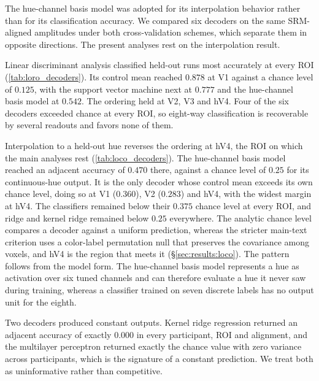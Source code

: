 The hue-channel basis model was adopted for its interpolation behavior rather than for its classification accuracy. We compared six decoders on the same SRM-aligned amplitudes under both cross-validation schemes, which separate them in opposite directions. The present analyses rest on the interpolation result.

Linear discriminant analysis classified held-out runs most accurately at every ROI (\cref{tab:loro_decoders}). Its control mean reached $0.878$ at V1 against a chance level of $0.125$, with the support vector machine next at $0.777$ and the hue-channel basis model at $0.542$. The ordering held at V2, V3 and hV4. Four of the six decoders exceeded chance at every ROI, so eight-way classification is recoverable by several readouts and favors none of them.

Interpolation to a held-out hue reverses the ordering at hV4, the ROI on which the main analyses rest (\cref{tab:loco_decoders}). The hue-channel basis model reached an adjacent accuracy of $0.470$ there, against a chance level of $0.25$ for its continuous-hue output. It is the only decoder whose control mean exceeds its own chance level, doing so at V1 ($0.360$), V2 ($0.283$) and hV4, with the widest margin at hV4. The classifiers remained below their $0.375$ chance level at every ROI, and ridge and kernel ridge remained below $0.25$ everywhere. The analytic chance level compares a decoder against a uniform prediction, whereas the stricter main-text criterion uses a color-label permutation null that preserves the covariance among voxels, and hV4 is the region that meets it (\S\ref{sec:results:loco}). The pattern follows from the model form. The hue-channel basis model represents a hue as activation over six tuned channels and can therefore evaluate a hue it never saw during training, whereas a classifier trained on seven discrete labels has no output unit for the eighth.

Two decoders produced constant outputs. Kernel ridge regression returned an adjacent accuracy of exactly $0.000$ in every participant, ROI and alignment, and the multilayer perceptron returned exactly the chance value with zero variance across participants, which is the signature of a constant prediction. We treat both as uninformative rather than competitive.

